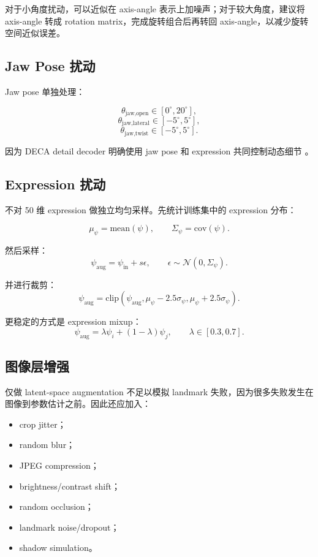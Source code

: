 \documentclass[UTF8,12pt,fontset=fandol]{ctexart}
\begin{document}
对于小角度扰动，可以近似在 axis-angle 表示上加噪声；对于较大角度，建议将 axis-angle 转成 rotation matrix，完成旋转组合后再转回 axis-angle，以减少旋转空间近似误差。

\subsection{Jaw Pose 扰动}

Jaw pose 单独处理：

\[
\theta_{\text{jaw,open}} \in [0^\circ,20^\circ],
\]
\[
\theta_{\text{jaw,lateral}} \in [-5^\circ,5^\circ],
\]
\[
\theta_{\text{jaw,twist}} \in [-5^\circ,5^\circ].
\]

因为 DECA detail decoder 明确使用 jaw pose 和 expression 共同控制动态细节 \cite{deca2021}。

\subsection{Expression 扰动}

不对 50 维 expression 做独立均匀采样。先统计训练集中的 expression 分布：

\[
\mu_{\psi}=\mathrm{mean}(\psi),\qquad
\Sigma_{\psi}=\mathrm{cov}(\psi).
\]

然后采样：
\[
\psi_{\text{aug}}=\psi_{\text{in}} + s\epsilon,\qquad
\epsilon\sim \mathcal{N}(0,\Sigma_{\psi}).
\]

并进行裁剪：
\[
\psi_{\text{aug}} =
\mathrm{clip}(\psi_{\text{aug}},
\mu_{\psi}-2.5\sigma_{\psi},
\mu_{\psi}+2.5\sigma_{\psi}).
\]

更稳定的方式是 expression mixup：
\[
\psi_{\text{aug}} =
\lambda\psi_i + (1-\lambda)\psi_j,\qquad
\lambda\in[0.3,0.7].
\]

\subsection{图像层增强}

仅做 latent-space augmentation 不足以模拟 landmark 失败，因为很多失败发生在图像到参数估计之前。因此还应加入：

\begin{itemize}
    \item crop jitter；
    \item random blur；
    \item JPEG compression；
    \item brightness/contrast shift；
    \item random occlusion；
    \item landmark noise/dropout；
    \item shadow simulation。
\end{itemize}
\end{document}
